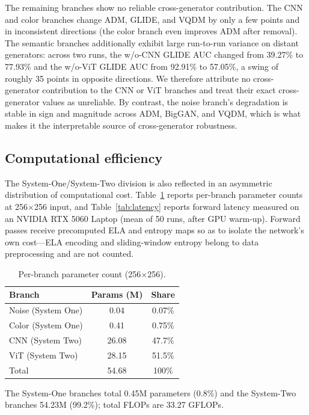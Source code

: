 \documentclass[11pt,a4paper]{article}
\begin{document}
The remaining branches show no reliable cross-generator contribution. The CNN and color branches change ADM, GLIDE, and VQDM by only a few points and in inconsistent directions (the color branch even improves ADM after removal). The semantic branches additionally exhibit large run-to-run variance on distant generators: across two runs, the w/o-CNN GLIDE AUC changed from 39.27\% to 77.93\% and the w/o-ViT GLIDE AUC from 92.91\% to 57.05\%, a swing of roughly 35 points in opposite directions. We therefore attribute no cross-generator contribution to the CNN or ViT branches and treat their exact cross-generator values as unreliable. By contrast, the noise branch's degradation is stable in sign and magnitude across ADM, BigGAN, and VQDM, which is what makes it the interpretable source of cross-generator robustness.

\subsection{Computational efficiency}

The System-One/System-Two division is also reflected in an asymmetric distribution of computational cost. Table~\ref{tab:params} reports per-branch parameter counts at 256$\times$256 input, and Table~\ref{tab:latency} reports forward latency measured on an NVIDIA RTX 5060 Laptop (mean of 50 runs, after GPU warm-up). Forward passes receive precomputed ELA and entropy maps so as to isolate the network's own cost---ELA encoding and sliding-window entropy belong to data preprocessing and are not counted.

\begin{table}[h]
\centering
\caption{Per-branch parameter count (256$\times$256).}
\label{tab:params}
\begin{tabular}{lcc}
\toprule
Branch & Params (M) & Share \\
\midrule
Noise (System One) & 0.04 & 0.07\% \\
Color (System One) & 0.41 & 0.75\% \\
CNN (System Two) & 26.08 & 47.7\% \\
ViT (System Two) & 28.15 & 51.5\% \\
\midrule
Total & 54.68 & 100\% \\
\bottomrule
\end{tabular}
\end{table}

The System-One branches total 0.45M parameters (0.8\%) and the System-Two branches 54.23M (99.2\%); total FLOPs are 33.27 GFLOPs.
\end{document}
